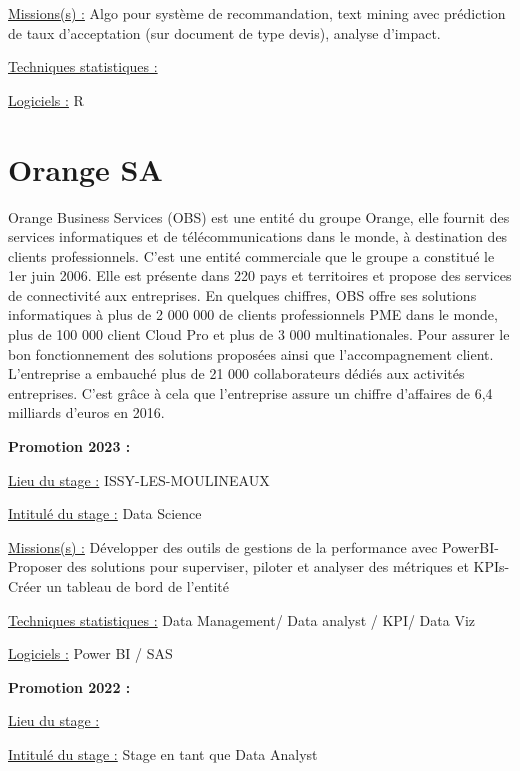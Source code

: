\documentclass[
  letterpaper,
  DIV=11,
  numbers=noendperiod]{scrreprt}
\begin{document}
\uline{Missions(s) :} Algo pour système de recommandation, text mining
avec prédiction de taux d'acceptation (sur document de type devis),
analyse d'impact.

\uline{Techniques statistiques :}

\uline{Logiciels :} R

\hypertarget{orange-sa}{%
\section{\texorpdfstring{\textbf{Orange
SA}}{Orange SA}}\label{orange-sa}}

Orange Business Services (OBS) est une entité du groupe Orange, elle
fournit des services informatiques et de télécommunications dans le
monde, à destination des clients professionnels. C'est une entité
commerciale que le groupe a constitué le 1er juin 2006. Elle est
présente dans 220 pays et territoires et propose des services de
connectivité aux entreprises. En quelques chiffres, OBS offre ses
solutions informatiques à plus de 2 000 000 de clients professionnels
PME dans le monde, plus de 100 000 client Cloud Pro et plus de 3 000
multinationales. Pour assurer le bon fonctionnement des solutions
proposées ainsi que l'accompagnement client. L'entreprise a embauché
plus de 21 000 collaborateurs dédiés aux activités entreprises. C'est
grâce à cela que l'entreprise assure un chiffre d'affaires de 6,4
milliards d'euros en 2016.

\textbf{Promotion 2023 :}

\uline{Lieu du stage :} ISSY-LES-MOULINEAUX

\uline{Intitulé du stage :} Data Science

\uline{Missions(s) :} Développer des outils de gestions de la
performance avec PowerBI- Proposer des solutions pour superviser,
piloter et analyser des métriques et KPIs- Créer un tableau de bord de
l'entité

\uline{Techniques statistiques :} Data Management/ Data analyst / KPI/
Data Viz

\uline{Logiciels :} Power BI / SAS

\textbf{Promotion 2022 :}

\uline{Lieu du stage :}

\uline{Intitulé du stage :} Stage en tant que Data Analyst
\end{document}
